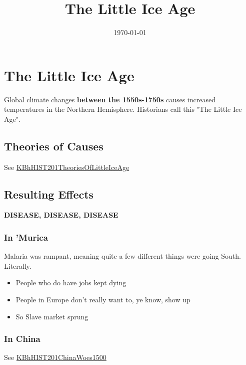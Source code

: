 \documentclass[letterpaper]{article}
\date{\today}
\title{The Little Ice Age}
\renewcommand{\tableofcontents}{}
\begin{document}
\tableofcontents



\section{The Little Ice Age}
\label{sec:org2b6d77e}
Global climate changes \textbf{between the 1550s-1750s} causes increased
temperatures in the Northern Hemisphere. Historians call this "The
Little Ice Age".

\subsection{Theories of Causes}
\label{sec:orgaece2dc}
See
\href{KBhHIST201TheoriesOfLittleIceAge.org}{KBhHIST201TheoriesOfLittleIceAge}

\subsection{Resulting Effects}
\label{sec:orga6267f0}
\textbf{DISEASE, DISEASE, DISEASE}

\subsubsection{In 'Murica}
\label{sec:orge50ea90}
Malaria was rampant, meaning quite a few different things were going
South. Literally.

\begin{itemize}
\item People who do have jobs kept dying
\item People in Europe don't really want to, ye know, show up
\item So Slave market sprung
\end{itemize}

\subsubsection{In China}
\label{sec:org2383e26}
See \href{KBhHIST201ChinaWoes1500.org}{KBhHIST201ChinaWoes1500}
\end{document}
